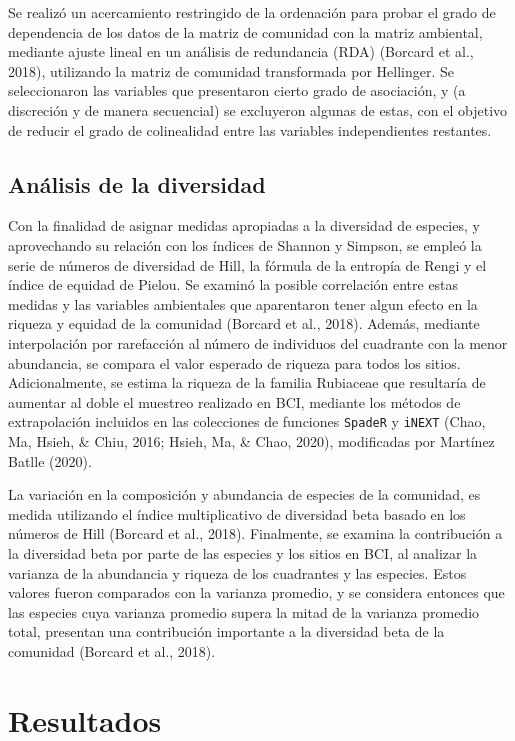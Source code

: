 \documentclass[11pt,]{article}
\begin{document}
Se realizó un acercamiento restringido de la ordenación para probar el
grado de dependencia de los datos de la matriz de comunidad con la
matriz ambiental, mediante ajuste lineal en un análisis de redundancia
(RDA) (Borcard et al., 2018), utilizando la matriz de comunidad
transformada por Hellinger. Se seleccionaron las variables que
presentaron cierto grado de asociación, y (a discreción y de manera
secuencial) se excluyeron algunas de estas, con el objetivo de reducir
el grado de colinealidad entre las variables independientes restantes.

\subsection{Análisis de la
diversidad}\label{anuxe1lisis-de-la-diversidad}

Con la finalidad de asignar medidas apropiadas a la diversidad de
especies, y aprovechando su relación con los índices de Shannon y
Simpson, se empleó la serie de números de diversidad de Hill, la fórmula
de la entropía de Rengi y el índice de equidad de Pielou. Se examinó la
posible correlación entre estas medidas y las variables ambientales que
aparentaron tener algun efecto en la riqueza y equidad de la comunidad
(Borcard et al., 2018). Además, mediante interpolación por rarefacción
al número de individuos del cuadrante con la menor abundancia, se
compara el valor esperado de riqueza para todos los sitios.
Adicionalmente, se estima la riqueza de la familia Rubiaceae que
resultaría de aumentar al doble el muestreo realizado en BCI, mediante
los métodos de extrapolación incluidos en las colecciones de funciones
\texttt{SpadeR} y \texttt{iNEXT} (Chao, Ma, Hsieh, \& Chiu, 2016; Hsieh,
Ma, \& Chao, 2020), modificadas por Martínez Batlle (2020).

La variación en la composición y abundancia de especies de la comunidad,
es medida utilizando el índice multiplicativo de diversidad beta basado
en los números de Hill (Borcard et al., 2018). Finalmente, se examina la
contribución a la diversidad beta por parte de las especies y los sitios
en BCI, al analizar la varianza de la abundancia y riqueza de los
cuadrantes y las especies. Estos valores fueron comparados con la
varianza promedio, y se considera entonces que las especies cuya
varianza promedio supera la mitad de la varianza promedio total,
presentan una contribución importante a la diversidad beta de la
comunidad (Borcard et al., 2018).

\section{Resultados}\label{resultados}
\end{document}
